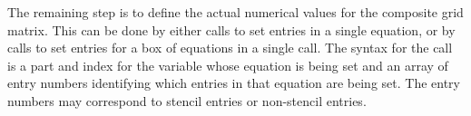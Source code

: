 The remaining step is to define the actual numerical values for the composite
grid matrix.  This can be done by either  calls to set
entries in a single equation, or by  calls to set
entries for a box of equations in a single call.  The syntax for the
 call is a part and index for the variable whose
equation is being set and an array of entry numbers identifying which entries
in that equation are being set.  The entry numbers may correspond to stencil
entries or non-stencil entries.
